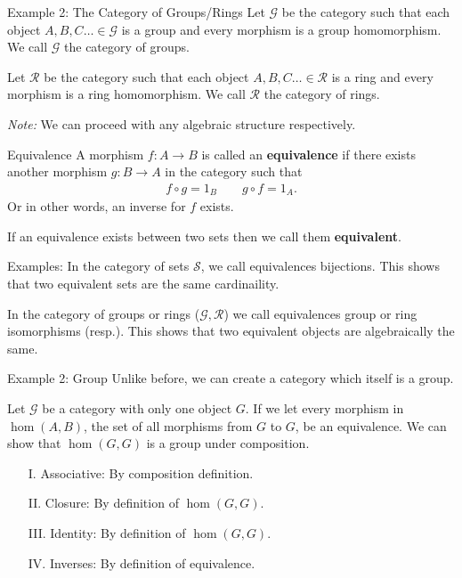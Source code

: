\documentclass[12pt]{beamer}
\begin{document}
\begin{frame}{Example 2: The Category of Groups/Rings}
    Let $\mathcal{G}$ be the category such that each object $A,B,C\dots\in\mathcal{G}$ is a group and every morphism is a group homomorphism. We call $\mathcal{G}$ the category of groups.
    
    \quad
    
    Let $\mathcal{R}$ be the category such that each object $A,B,C\dots\in\mathcal{R}$ is a ring and every morphism is a ring homomorphism. We call $\mathcal{R}$ the category of rings.
    
    \quad
    
    \textit{Note:} We can proceed with any algebraic structure respectively.
\end{frame}

\begin{frame}{Equivalence}
    A morphism $f:A\rightarrow B$ is called an \textbf{equivalence} if there exists another morphism $g:B\rightarrow A$ in the category such that
    \begin{align*}
        f\circ g = 1_B \qquad g\circ f = 1_A.
    \end{align*}
    Or in other words, an inverse for $f$ exists.
    
    \quad
    
    If an equivalence exists between two sets then we call them \textbf{equivalent}.
\end{frame}

\begin{frame}{Examples:}
    In the category of sets $\mathscr{S}$, we call equivalences bijections. This shows that two equivalent sets are the same cardinaility.
    
    \quad
    
    In the category of groups or rings ($\mathcal{G},\mathcal{R}$) we call equivalences group or ring isomorphisms (resp.). This shows that two equivalent objects are algebraically the same.
\end{frame}

\begin{frame}{Example 2: Group}
    Unlike before, we can create a category which itself is a group. 
    
    \quad
    
    Let $\mathscr{G}$ be a category with only one object $G$. If we let every morphism in $\hom(A,B)$, the set of all morphisms from $G$ to $G$, be an equivalence. We can show that $\hom(G,G)$ is a group under composition.
    \begin{itemize}
        \item[I.] Associative: By composition definition.
        \item[II.] Closure: By definition of $\hom(G,G)$.
        \item[III.] Identity: By definition of $\hom(G,G)$.
        \item[IV.] Inverses: By definition of equivalence.
    \end{itemize}
\end{frame}
\end{document}
